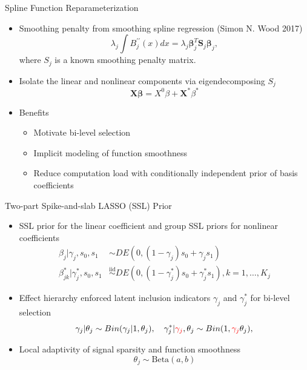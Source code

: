 \documentclass[
  ignorenonframetext,
  aspectratio=169]{beamer}
\providecommand{\tightlist}{%
  \setlength{\itemsep}{0pt}\setlength{\parskip}{0pt}}
\newcommand{\bs}[1]{\boldsymbol{#1}}
\newcommand{\tp}{*}
\newcommand{\simiid}{\overset{\text{iid}}{\sim}}
\newcommand{\bg}[1]{\textcolor{red}{#1}}
\begin{document}
\begin{frame}{Spline Function Reparameterization}
\protect\hypertarget{spline-function-reparameterization}{}
\begin{itemize}
\item
  Smoothing penalty from smoothing spline regression (Simon N. Wood
  2017) \[
  \lambda_j \int B^{\prime\prime}_j(x)dx = \lambda_j \bs \beta_j^T \bs S_j \bs \beta_j,
  \] where \(S_j\) is a known smoothing penalty matrix.
\item
  Isolate the linear and nonlinear components via eigendecomposing
  \(S_j\) \[\bm X \bm \beta = X^{0} \beta + \bs X^\tp\beta^\tp\]
\item
  Benefits

  \begin{itemize}
  \tightlist
  \item
    Motivate bi-level selection
  \item
    Implicit modeling of function smoothness
  \item
    Reduce computation load with conditionally independent prior of
    basis coefficients
  \end{itemize}
\end{itemize}
\end{frame}

\begin{frame}{Two-part Spike-and-slab LASSO (SSL) Prior}
\protect\hypertarget{two-part-spike-and-slab-lasso-ssl-prior}{}
\begin{itemize}
\tightlist
\item
  SSL prior for the linear coefficient and group SSL priors for
  nonlinear coefficients \begin{align*}
  \beta_{j} |\gamma_{j},s_0,s_1 &\sim DE(0,(1-\gamma_{j}) s_0 + \gamma_{j} s_1) \\
  \beta^\tp_{jk} | \gamma^\tp_{j},s_0,s_1 &\simiid DE(0,(1-\gamma^\tp_{j}) s_0 + \gamma^\tp_{j} s_1), k = 1, \dots, K_j
  \end{align*}
\item
  Effect hierarchy enforced latent inclusion indicators \(\gamma_j\) and
  \(\gamma^\tp_{j}\) for bi-level selection \[
  \gamma_{j} | \theta_j \sim Bin(\gamma_{j}|1, \theta_j),\quad
  \gamma_{j}^\tp | \bg{\gamma_{j}}, \theta_j \sim Bin(1, \bg{\gamma_{j}}\theta_j),
  \]
\item
  Local adaptivity of signal sparsity and function smoothness \[
  \theta_j \sim \text{Beta}(a,b)
  \]
\end{itemize}
\end{frame}
\end{document}
